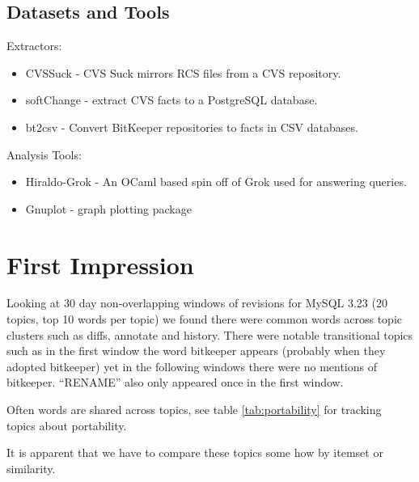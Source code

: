 \documentclass{report}
\begin{document}
\subsection{Datasets and Tools}

Extractors:
\begin{itemize}
\item CVSSuck - CVS Suck mirrors RCS files from a CVS repository. 
\item softChange - extract CVS facts to a PostgreSQL database.
\item bt2csv - Convert BitKeeper repositories to facts in CSV
  databases.
\end{itemize}

Analysis Tools:
\begin{itemize}
\item Hiraldo-Grok - An OCaml based spin off of Grok used for
  answering queries.
\item Gnuplot - graph plotting package
\end{itemize}









\section{First Impression}


Looking at 30 day non-overlapping windows of revisions for MySQL 3.23
(20 topics, top 10 words per topic) we found there were common words
across topic clusters such as diffs, annotate and history. There were
notable transitional topics such as in the first window the word
bitkeeper appears (probably when they adopted bitkeeper) yet in the
following windows there were no mentions of bitkeeper. ``RENAME'' also
only appeared once in the first window.

Often words are shared across topics, see table \ref{tab:portability}
for tracking topics about portability.

It is apparent that we have to compare these topics some how by
itemset or similarity.
\end{document}
